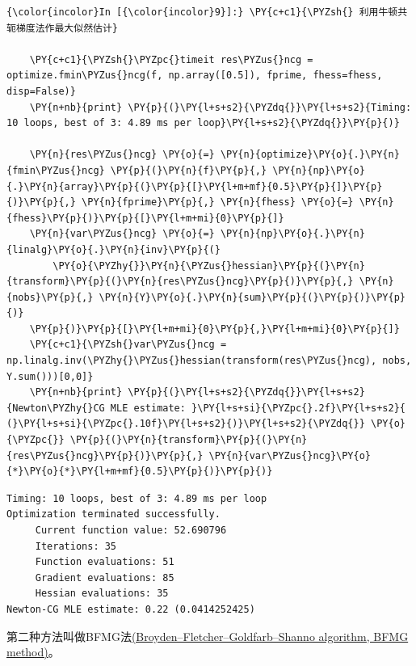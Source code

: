 \begin{Verbatim}[commandchars=\\\{\}]
{\color{incolor}In [{\color{incolor}9}]:} \PY{c+c1}{\PYZsh{} 利用牛顿共轭梯度法作最大似然估计}

    \PY{c+c1}{\PYZsh{}\PYZpc{}timeit res\PYZus{}ncg = optimize.fmin\PYZus{}ncg(f, np.array([0.5]), fprime, fhess=fhess, disp=False)}
    \PY{n+nb}{print} \PY{p}{(}\PY{l+s+s2}{\PYZdq{}}\PY{l+s+s2}{Timing: 10 loops, best of 3: 4.89 ms per loop}\PY{l+s+s2}{\PYZdq{}}\PY{p}{)}

    \PY{n}{res\PYZus{}ncg} \PY{o}{=} \PY{n}{optimize}\PY{o}{.}\PY{n}{fmin\PYZus{}ncg} \PY{p}{(}\PY{n}{f}\PY{p}{,} \PY{n}{np}\PY{o}{.}\PY{n}{array}\PY{p}{(}\PY{p}{[}\PY{l+m+mf}{0.5}\PY{p}{]}\PY{p}{)}\PY{p}{,} \PY{n}{fprime}\PY{p}{,} \PY{n}{fhess} \PY{o}{=} \PY{n}{fhess}\PY{p}{)}\PY{p}{[}\PY{l+m+mi}{0}\PY{p}{]}
    \PY{n}{var\PYZus{}ncg} \PY{o}{=} \PY{n}{np}\PY{o}{.}\PY{n}{linalg}\PY{o}{.}\PY{n}{inv}\PY{p}{(}
        \PY{o}{\PYZhy{}}\PY{n}{\PYZus{}hessian}\PY{p}{(}\PY{n}{transform}\PY{p}{(}\PY{n}{res\PYZus{}ncg}\PY{p}{)}\PY{p}{,} \PY{n}{nobs}\PY{p}{,} \PY{n}{Y}\PY{o}{.}\PY{n}{sum}\PY{p}{(}\PY{p}{)}\PY{p}{)}
    \PY{p}{)}\PY{p}{[}\PY{l+m+mi}{0}\PY{p}{,}\PY{l+m+mi}{0}\PY{p}{]}
    \PY{c+c1}{\PYZsh{}var\PYZus{}ncg = np.linalg.inv(\PYZhy{}\PYZus{}hessian(transform(res\PYZus{}ncg), nobs, Y.sum()))[0,0]}
    \PY{n+nb}{print} \PY{p}{(}\PY{l+s+s2}{\PYZdq{}}\PY{l+s+s2}{Newton\PYZhy{}CG MLE estimate: }\PY{l+s+si}{\PYZpc{}.2f}\PY{l+s+s2}{ (}\PY{l+s+si}{\PYZpc{}.10f}\PY{l+s+s2}{)}\PY{l+s+s2}{\PYZdq{}} \PY{o}{\PYZpc{}} \PY{p}{(}\PY{n}{transform}\PY{p}{(}\PY{n}{res\PYZus{}ncg}\PY{p}{)}\PY{p}{,} \PY{n}{var\PYZus{}ncg}\PY{o}{*}\PY{o}{*}\PY{l+m+mf}{0.5}\PY{p}{)}\PY{p}{)}
\end{Verbatim}

\begin{Verbatim}[commandchars=\\\{\}]
Timing: 10 loops, best of 3: 4.89 ms per loop
Optimization terminated successfully.
     Current function value: 52.690796
     Iterations: 35
     Function evaluations: 51
     Gradient evaluations: 85
     Hessian evaluations: 35
Newton-CG MLE estimate: 0.22 (0.0414252425)

\end{Verbatim}

第二种方法叫做BFMG法\href{https://en.wikipedia.org/wiki/Broyden–Fletcher–Goldfarb–Shanno_algorithm}{(Broyden--Fletcher--Goldfarb--Shanno
algorithm, BFMG method)}。

